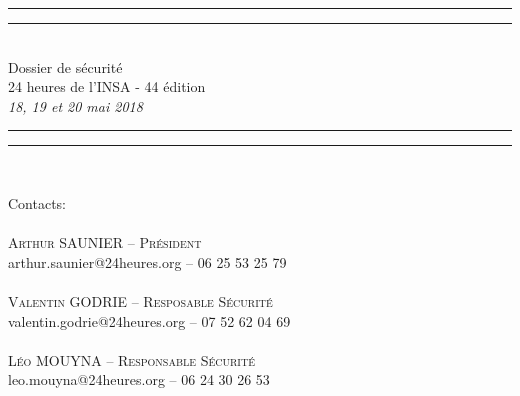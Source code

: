 \documentclass[hidelinks, paper=a4, fontsize=13pt]{report}
\begin{document}
\begin{center}
\rule[0.5ex]{\linewidth}{2pt}\vspace*{-\baselineskip}\vspace*{4.2pt}
\rule[0.5ex]{\linewidth}{1pt}\\[\baselineskip]
\huge Dossier de sécurité\\24 heures de l'INSA - 44 édition \\[4mm]
{\Large \textit{18, 19 et 20 mai 2018}}\\
\rule[0.5ex]{\linewidth}{1pt}\vspace*{-\baselineskip}\vspace{3.2pt}
\rule[0.5ex]{\linewidth}{2pt}\\
\vspace{20mm}
\end{center}
{\large Contacts:}\\
\vspace{3.5mm}
{\large\textsc{\\
Arthur SAUNIER – Président\\}
arthur.saunier@24heures.org  – 06 25 53 25 79\\\\\textsc{
Valentin GODRIE – Resposable Sécurité\\}
valentin.godrie@24heures.org – 07 52 62 04 69\\\\\textsc{
Léo MOUYNA – Responsable Sécurité\\}
leo.mouyna@24heures.org  – 06 24 30 26 53\\\\}\\
\vspace{20mm}
\end{document}
